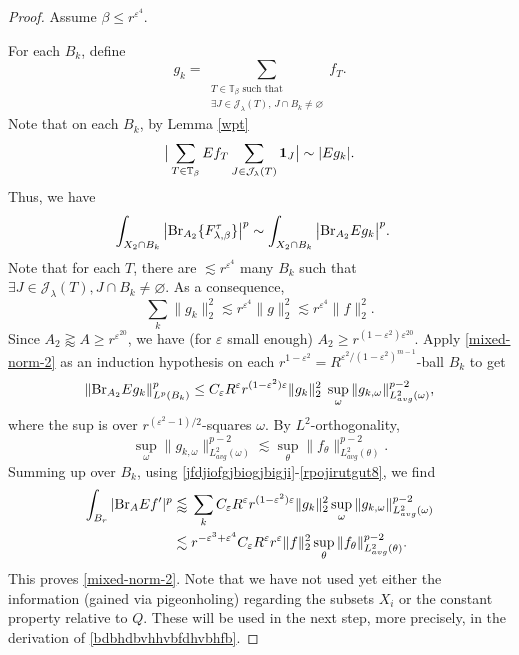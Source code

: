 \documentclass{amsart}%
\numberwithin{equation}{section}
\newcommand{\be}{\beta}
\newcommand{\e}{\varepsilon}
\newcommand{\la}{\lambda}
\newcommand{\om}{\omega}
\newcommand{\cj}{\mathcal J}
\newcommand{\ZT}{\mathbb{T}}
\newcommand{\Id}{{\bf{1}}}
\newcommand{\Br}{{\rm{Br}}}
\newcommand{\1}{\mathbbm{1}}
\begin{document}
\begin{proof}
	 Assume $\be\leq r^{\e^4}$.
	
	For each $B_k$, define 
	\begin{equation}
		\nonumber
		g_{k}=\sum_{\substack{T\in\ZT_{\be} \text{ such that}\\ \exists J\in\cj_\la(T),\, J\cap B_k\not=\varnothing}} f_{T}.
	\end{equation}
    Note that on each $B_k$, by Lemma \ref{wpt}
    $$\big|\sum_{T\in\ZT_{\be}}Ef_T\sum_{J\in\cj_{\la}(T)}\Id_J\big|\sim |Eg_k|.$$
	Thus, we have
	\begin{align}
		\label{related}
		\int_{X_2\cap B_k}\big|\Br_{A_2}\{F_{\lambda,\beta}^\tau\}\big|^p&\sim\int_{X_2\cap B_k}\big|\Br_{A_2} Eg_k\big|^p.
	\end{align}
	Note that for each $T$, there are $\lesssim r^{\e^{4}}$ many $B_k$ such that $\exists J\in\cj_\la(T), J\cap B_k\not=\varnothing$.
	As a consequence, 
	\begin{equation}
		\label{l2-related}
		\sum_{k}\|g_k\|_2^2\lesssim r^{\e^{4}}\|g\|_2^2\lesssim r^{\e^4}\|f\|_2^2. 
	\end{equation}
	Since $A_2\gtrapprox A\geq r^{\e^{20}}$, we have (for $\e$ small enough) $A_2\geq r^{(1-\e^2)\e^{20}}$.
	Apply \eqref{mixed-norm-2} as an induction hypothesis on each $r^{1-\e^2}=R^{\e^2/(1-\e^2)^{m-1}}$-ball $B_k$ to get
	\begin{equation}
		\label{vpofigtug8utr8gurtg98u}
		\|\Br_{A_2} Eg_k\|_{L^p(B_k)}^p\leq C_\e R^\e r^{(1-\e^2)\e}\|g_k\|_2^2\;\sup_{\om}\|g_{k,\om}\|_{L_{avg}^2(\om)}^{p-2},
	\end{equation}
	where the sup is over  $ r^{(\e^2-1)/2}$-squares $\om$.
	By $L^2$-orthogonality,  
    \begin{equation}
    \label{rpojirutgut8}
    \sup_{\om}\|g_{k,\om}\|_{L^2_{avg}(\om)}^{p-2}\lesssim\sup_{\theta}\|f_{\theta}\|_{L^2_{avg}(\theta)}^{p-2}.
    \end{equation}
	Summing up over $B_k$, using \eqref{jfdjiofgjbiogjbigji}-\eqref{rpojirutgut8},  we find
	\begin{align}
		\nonumber
		\int_{B_r}|\Br_{A} Ef'|^p&\lessapprox \, \sum_{k}C_\e R^\e r^{(1-\e^2)\e} \|g_k\|_2^2\sup_{\om}\|g_{k,\om}\|_{L^2_{avg}(\om)}^{p-2}\\ \nonumber
		&\lesssim  r^{-\e^3+\e^4}C_\e R^\e r^{\e}\|f\|_2^2\sup_{\theta}\|f_{\theta}\|_{L^2_{avg}(\theta)}^{p-2}.
	\end{align}
	This proves \eqref{mixed-norm-2}. Note that  we  have not used yet either the information (gained via pigeonholing) regarding the subsets $X_i$ or the constant property relative to $Q$. These will be used in the next step, more precisely, in the derivation of \eqref{bdbhdbvhhvbfdhvbhfb}.  
	

\end{proof}
\end{document}
